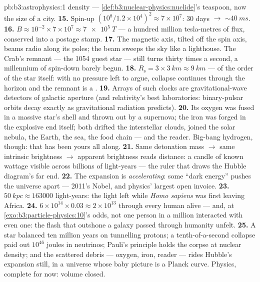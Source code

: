 \begin{solution}{pb:b3:astrophysics:1}
density --- \cref{def:b3:nuclear-physics:nuclide}'s teaspoon,
now the size of a city.
\textbf{15.} Spin-up $(10^8/1.2\times10^4)^2 \approx
7\times10^{7}$: 30 days $\to$ ${\sim}\qty{40}{ms}$.
\textbf{16.} $B \approx 10^{-2}\times7\times10^{7} \approx
\qty{7e5}{T}$ --- a hundred million tesla-metres of flux,
conserved into a postage stamp.
\textbf{17.} The magnetic axis, tilted off the spin axis,
beams radio along its poles; the beam sweeps the sky like a
lighthouse. The Crab's remnant --- the 1054 guest star --- still
turns thirty times a second, a millennium of spin-down barely
begun.
\textbf{18.} $R_{\text{s}} = 3\times\qty{3}{km} \approx
\qty{9}{km}$ --- of the order of the star itself: with no
pressure left to argue, collapse continues through the horizon
and the remnant is a .
\textbf{19.} Arrays of such clocks are gravitational-wave
detectors of galactic aperture (and relativity's best
laboratories: binary-pulsar orbits decay exactly as
gravitational radiation predicts).
\textbf{20.} Its oxygen was fused in a massive star's shell
and thrown out by a supernova; the iron was forged in the
explosive end itself; both drifted the interstellar clouds,
joined the solar nebula, the Earth, the sea, the food chain
--- and the reader. Big-bang hydrogen, though: that has been
yours all along.
\textbf{21.} Same detonation mass $\to$ same intrinsic
brightness $\to$ apparent brightness reads distance: a candle
of known wattage visible across billions of light-years ---
the ruler that draws the Hubble diagram's far end.
\textbf{22.} The expansion is \emph{accelerating}: some
``dark energy'' pushes the universe apart --- 2011's Nobel,
and physics' largest open invoice.
\textbf{23.} $\qty{50}{kpc} \approx 163000$ light-years: the
light left while \emph{Homo sapiens} was first leaving Africa.
\textbf{24.} $6\times10^{14}\times0.03 \approx 2\times10^{13}$
through every human alive --- and, at
\cref{exo:b3:particle-physics:10}'s odds, not one person in a
million interacted with even one: the flash that outshone a
galaxy passed through humanity unfelt.
\textbf{25.} A star balanced ten million years on tunnelling
protons; a tenth-of-a-second collapse paid out $10^{46}$
joules in neutrinos; Pauli's principle holds the corpse at
nuclear density; and the scattered debris --- oxygen, iron,
reader --- rides Hubble's expansion still, in a universe whose
baby picture is a Planck curve. Physics, complete for now:
volume closed.
\end{solution}
